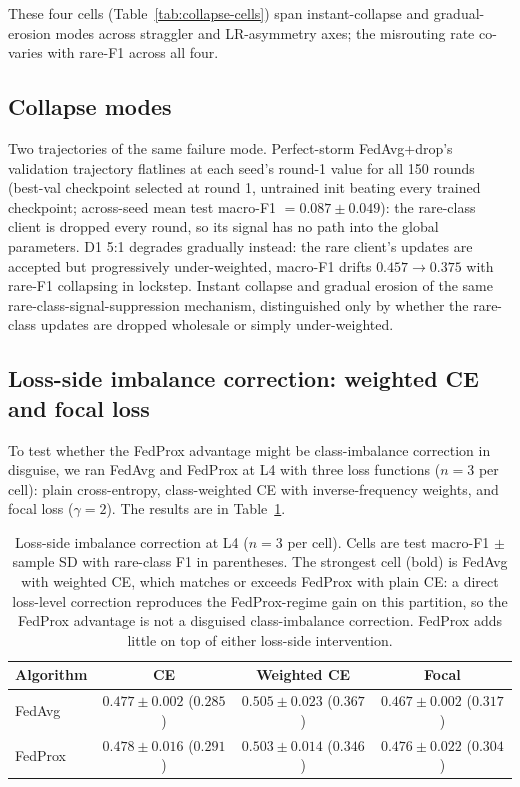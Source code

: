 \documentclass[11pt,a4paper]{report}
\begin{document}
\noindent
These four cells (Table~\ref{tab:collapse-cells}) span instant-collapse and
gradual-erosion modes across straggler and LR-asymmetry axes; the misrouting
rate co-varies with rare-F1 across all four.


\subsection{Collapse modes}

Two trajectories of the same failure mode. Perfect-storm FedAvg+drop's
validation trajectory flatlines at each seed's round-1 value for all 150
rounds (best-val checkpoint selected at round 1, untrained init beating
every trained checkpoint; across-seed mean test macro-F1 $= 0.087 \pm 0.049$):
the rare-class client is dropped every round, so its signal has no path
into the global parameters. D1 5:1 degrades gradually instead: the rare client's updates
are accepted but progressively under-weighted, macro-F1 drifts $0.457 \to
0.375$ with rare-F1 collapsing in lockstep. Instant collapse and gradual
erosion of the same rare-class-signal-suppression mechanism, distinguished
only by whether the rare-class updates are dropped wholesale or simply
under-weighted.


\subsection{Loss-side imbalance correction: weighted CE and
focal loss}

To test whether the FedProx advantage might be class-imbalance correction
in disguise, we ran FedAvg and FedProx at L4 with three loss functions
($n=3$ per cell): plain cross-entropy, class-weighted CE with
inverse-frequency weights, and focal loss ($\gamma = 2$). The results are
in Table~\ref{tab:loss-side}.

\begin{table}[H]
\centering
\caption{Loss-side imbalance correction at L4 ($n=3$ per cell). Cells are
test macro-F1 $\pm$ sample SD with rare-class F1 in parentheses. The
strongest cell (bold) is FedAvg with weighted CE, which matches or exceeds
FedProx with plain CE: a direct loss-level correction reproduces the
FedProx-regime gain on this partition, so the FedProx advantage is not a
disguised class-imbalance correction. FedProx adds little on top of either
loss-side intervention.}
\label{tab:loss-side}
\begin{tabular}{lccc}
\hline
Algorithm & CE & Weighted CE & Focal \\
\hline
FedAvg  & $0.477 \pm 0.002$ ($0.285$) & $\mathbf{0.505 \pm 0.023}$ ($\mathbf{0.367}$) & $0.467 \pm 0.002$ ($0.317$) \\
FedProx & $0.478 \pm 0.016$ ($0.291$) & $0.503 \pm 0.014$ ($0.346$)                   & $0.476 \pm 0.022$ ($0.304$) \\
\hline
\end{tabular}
\end{table}
\end{document}
